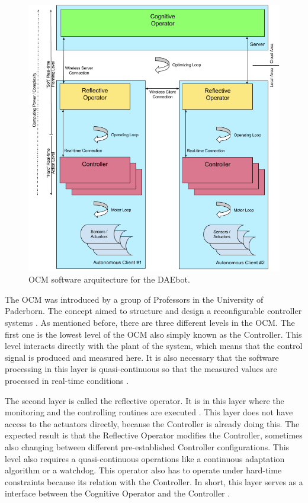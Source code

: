 \documentclass[12pt]{report}%
\begin{document}
\begin{figure}[h!t]
	\centering
	\includegraphics[width=\textwidth]{ocm}
    \caption{OCM software arquitecture for the DAEbot\cite{DAEbot_Wiki}.}
    \label{fig:ocm}
\end{figure}
\clearpage

The OCM was introduced by a group of Professors in the University of Paderborn. The concept aimed to structure and design a reconfigurable controller systems \cite{ocmAuto}. As mentioned before, there are three different levels in the OCM. The first one is the lowest level of the OCM also simply known as the Controller. This level interacts directly with the plant of the system, which means that the control signal is produced and measured here. It is also necessary that the software processing in this layer is quasi-continuous so that the measured values are processed in real-time conditions \cite{ocmAuto}.

The second layer is called the reflective operator. It is in this layer where the monitoring and the controlling routines are executed \cite{ocmAuto}. This layer does not have access to the actuators directly, because the Controller is already doing this. The expected result is that the Reflective Operator modifies the Controller, sometimes also changing between different pre-established Controller configurations. This level also requires a quasi-continuous operations like a continuous adaptation algorithm or a watchdog. This operator also has to operate under hard-time constraints because its relation with the Controller. In short, this layer serves as a interface between the Cognitive Operator and the Controller \cite{ocmAuto}.
\end{document}
